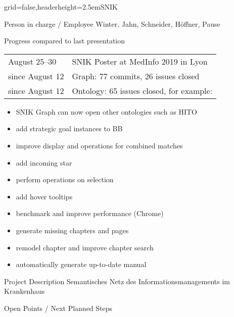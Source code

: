 \documentclass[english]{kiesgrube}
\begin{document}
\begin{poster}{grid=false,headerheight=2.5em}{}{SNIK}{}{}
\begin{posterbox}[name=person,column=0,row=0]{Person in charge / Employee}
Winter, Jahn, Schneider, Höffner, Pause
\end{posterbox}
\begin{posterbox}[name=progress,below=person]{Progress compared to last presentation}
\begin{tabulary}{\textwidth}{lL}
August 25--30		&SNIK Poster at MedInfo 2019 in Lyon\\
since August 12		&Graph: 77 commits, 26 issues closed\\
since August 12		&Ontology: 65 issues closed, for example:
\end{tabulary}
\begin{itemize}
\item SNIK Graph can now open other ontologies such as HITO
\item add strategic goal instances to BB
\item improve display and operations for combined matches
\item add incoming star 
\item perform operations on selection 
\item add hover tooltips 
\item benchmark and improve performance (Chrome)
\item generate missing chapters and pages
\item remodel chapter and improve chapter search
\item automatically generate up-to-date manual
\end{itemize}
\end{posterbox}
\begin{posterbox}[name=description,column=1,row=0]{Project Description}
\small
Semantisches Netz des Informationsmanagements im Krankenhaus
\end{posterbox}
\begin{posterbox}[name=open,column=1,below=description]{Open Points / Next Planned Steps}

\end{posterbox}
\end{poster}
\end{document}
